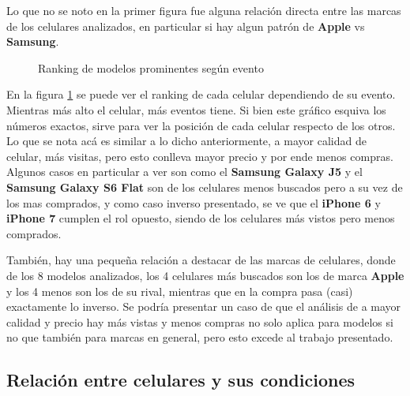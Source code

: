 \documentclass[a4paper]{article}
\begin{document}
Lo que no se noto en la primer figura fue alguna relación directa entre las marcas de los celulares analizados, en particular si hay algun patrón de \textbf{Apple} vs \textbf{Samsung}.

\begin{figure}[h!]
	\caption{Ranking de modelos prominentes según evento}
	\label{fig:prominentesrank}
\end{figure}

En la figura \ref{fig:prominentesrank} se puede ver el ranking de cada celular dependiendo de su evento. Mientras más alto el celular, más eventos tiene. Si bien este gráfico esquiva los números exactos, sirve para ver la posición de cada celular respecto de los otros. Lo que se nota acá es similar a lo dicho anteriormente, a mayor calidad de celular, más visitas, pero esto conlleva mayor precio y por ende menos compras. Algunos casos en particular a ver son como el \textbf{Samsung Galaxy J5} y el \textbf{Samsung Galaxy S6 Flat} son de los celulares menos buscados pero a su vez de los mas comprados, y como caso inverso presentado, se ve que el \textbf{iPhone 6} y \textbf{iPhone 7} cumplen el rol opuesto, siendo de los celulares más vistos pero menos comprados.

También, hay una pequeña relación a destacar de las marcas de celulares, donde de los 8 modelos analizados, los 4 celulares más buscados son los de marca \textbf{Apple} y los 4 menos son los de su rival, mientras que en la compra pasa (casi) exactamente lo inverso. Se podría presentar un caso de que el análisis de a mayor calidad y precio hay más vistas y menos compras no solo aplica para modelos si no que también para marcas en general, pero esto excede al trabajo presentado.

\subsection{Relación entre celulares y sus condiciones}
\end{document}
